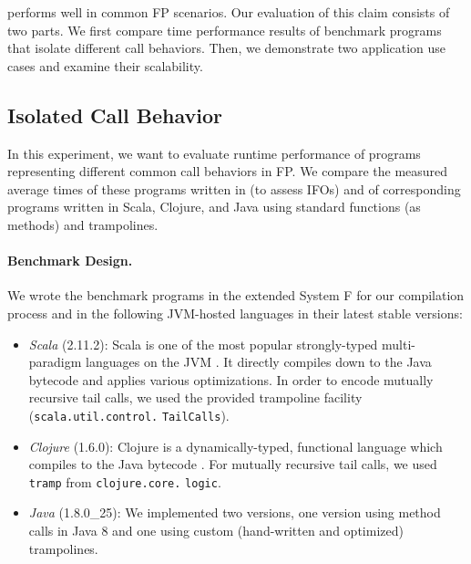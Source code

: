 \name performs well in common FP scenarios. Our evaluation of this claim consists of two
parts. We first compare time performance results of benchmark programs
that isolate different call behaviors. Then, we demonstrate two
application use cases and examine their scalability.

\subsection{Isolated Call Behavior}\label{sec:micro}

In this experiment, we want to evaluate runtime performance of
programs representing different common call behaviors in FP.
We compare the measured average times of these programs
written in \name (to assess IFOs) and of corresponding
programs written in Scala, Clojure, and Java using standard functions
(as methods) and trampolines.

\paragraph{Benchmark Design.}
We wrote the benchmark programs in the extended System F for our
compilation process and in the following JVM-hosted languages in their
latest stable versions:

\begin{itemize}

  \item \emph{Scala} (2.11.2): Scala is one of the most popular
    strongly-typed multi-paradigm languages on the JVM
    \cite{Odersky2014b}. It directly compiles down to the Java
    bytecode and applies various optimizations. In order to encode
    mutually recursive tail calls, we used the provided trampoline
    facility (\texttt{scala.util.control.} \texttt{TailCalls}).

  \item \emph{Clojure} (1.6.0): Clojure is a dynamically-typed,
    functional language which compiles to the Java bytecode
    \cite{Hickey2008}. For mutually recursive tail calls, we used
    \texttt{tramp} from \texttt{clojure.core.} \texttt{logic}.
  
  \item \emph{Java} (1.8.0\_25): We implemented two versions, one
    version using method calls in Java 8 and one using custom
    (hand-written and optimized) trampolines.

\end{itemize}
  
